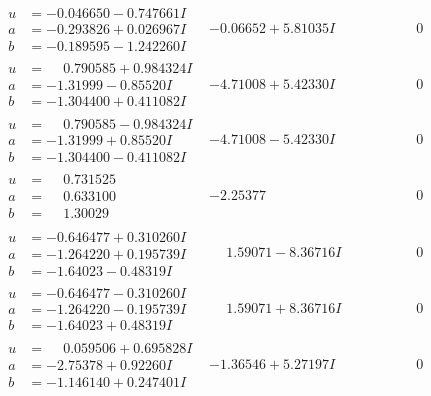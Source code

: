 \documentclass[1p]{elsarticle_modified}
\theoremstyle{definition}
\begin{document}
$$\begin{array}{c|c|c}
\begin{aligned}
u &= -0.046650 - 0.747661 I \\
a &= -0.293826 + 0.026967 I \\
b &= -0.189595 - 1.242260 I\end{aligned}
 & -0.06652 + 5.81035 I & \phantom{-0.000000 } 0 \\ \hline\begin{aligned}
u &= \phantom{-}0.790585 + 0.984324 I \\
a &= -1.31999 - 0.85520 I \\
b &= -1.304400 + 0.411082 I\end{aligned}
 & -4.71008 + 5.42330 I & \phantom{-0.000000 } 0 \\ \hline\begin{aligned}
u &= \phantom{-}0.790585 - 0.984324 I \\
a &= -1.31999 + 0.85520 I \\
b &= -1.304400 - 0.411082 I\end{aligned}
 & -4.71008 - 5.42330 I & \phantom{-0.000000 } 0 \\ \hline\begin{aligned}
u &= \phantom{-}0.731525\phantom{ +0.000000I} \\
a &= \phantom{-}0.633100\phantom{ +0.000000I} \\
b &= \phantom{-}1.30029\phantom{ +0.000000I}\end{aligned}
 & -2.25377\phantom{ +0.000000I} & \phantom{-0.000000 } 0 \\ \hline\begin{aligned}
u &= -0.646477 + 0.310260 I \\
a &= -1.264220 + 0.195739 I \\
b &= -1.64023 - 0.48319 I\end{aligned}
 & \phantom{-}1.59071 - 8.36716 I & \phantom{-0.000000 } 0 \\ \hline\begin{aligned}
u &= -0.646477 - 0.310260 I \\
a &= -1.264220 - 0.195739 I \\
b &= -1.64023 + 0.48319 I\end{aligned}
 & \phantom{-}1.59071 + 8.36716 I & \phantom{-0.000000 } 0 \\ \hline\begin{aligned}
u &= \phantom{-}0.059506 + 0.695828 I \\
a &= -2.75378 + 0.92260 I \\
b &= -1.146140 + 0.247401 I\end{aligned}
 & -1.36546 + 5.27197 I & \phantom{-0.000000 } 0 \\ \hline\begin{aligned}

\end{aligned}
\end{array}$$
\end{document}
